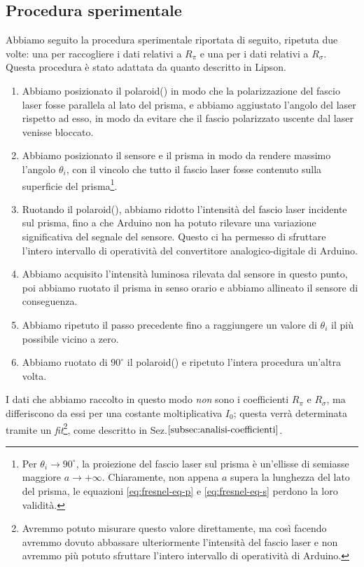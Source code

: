 \subsection{Procedura sperimentale}\label{subsec:procedura-sperimentale}
  Abbiamo seguito la procedura sperimentale riportata di seguito, ripetuta due
  volte: una per raccogliere i dati relativi a $R_\pi$ e una per i dati relativi
  a $R_\sigma$. Questa procedura è stato adattata da quanto descritto in Lipson\cite{lipson20}.
  \begin{enumerate}
    \item%
      Abbiamo posizionato il polaroid() in modo che la polarizzazione del
      fascio laser fosse parallela al lato del prisma, e abbiamo aggiustato l'angolo
      del laser rispetto ad esso, in modo da evitare che il fascio
      polarizzato uscente dal laser venisse bloccato.
    \item%
      Abbiamo posizionato il sensore e il prisma in modo da rendere
      massimo l'angolo $\theta_i$, con il vincolo che
      tutto il fascio laser fosse contenuto sulla superficie del prisma\footnote{Per $\theta_i \to 90^\circ$, la
      proiezione del fascio laser sul prisma è un'ellisse di semiasse maggiore $a \to +\infty$. Chiaramente, non appena
      $a$ supera la lunghezza del lato del prisma, le equazioni \eqref{eq:fresnel-eq-p} e \eqref{eq:fresnel-eq-s} perdono
      la loro validità.}.
    \item%
      Ruotando il polaroid(), abbiamo ridotto l’intensità del fascio laser
      incidente sul prisma, fino a che Arduino non ha potuto rilevare una
      variazione significativa del segnale del sensore.
      Questo ci ha permesso di sfruttare l'intero intervallo di operatività del convertitore analogico-digitale di Arduino.
    \item%
      Abbiamo acquisito l'intensità luminosa rilevata dal sensore in questo punto,
      poi abbiamo ruotato il prisma in senso orario e abbiamo
      allineato il sensore di conseguenza.
    \item%
      Abbiamo ripetuto il passo precedente fino a raggiungere un valore di $\theta_i$
      il più possibile vicino a zero.
    \item%
      Abbiamo ruotato di $90^\circ$ il polaroid() e ripetuto l'intera
      procedura un'altra volta.
  \end{enumerate}
  I dati che abbiamo raccolto in questo modo \emph{non} sono
  i coefficienti $R_\pi$ e $R_\sigma$, ma differiscono da essi per una costante
  moltiplicativa $I_0$; questa verrà determinata tramite un \emph{fit}\footnote{Avremmo potuto misurare
  questo valore direttamente, ma così facendo avremmo dovuto
  abbassare ulteriormente l'intensità del fascio laser e non avremmo più potuto
  sfruttare l'intero intervallo di operatività di Arduino.}, come descritto in Sez.$\ref{subsec:analisi-coefficienti}$.
\endinput

